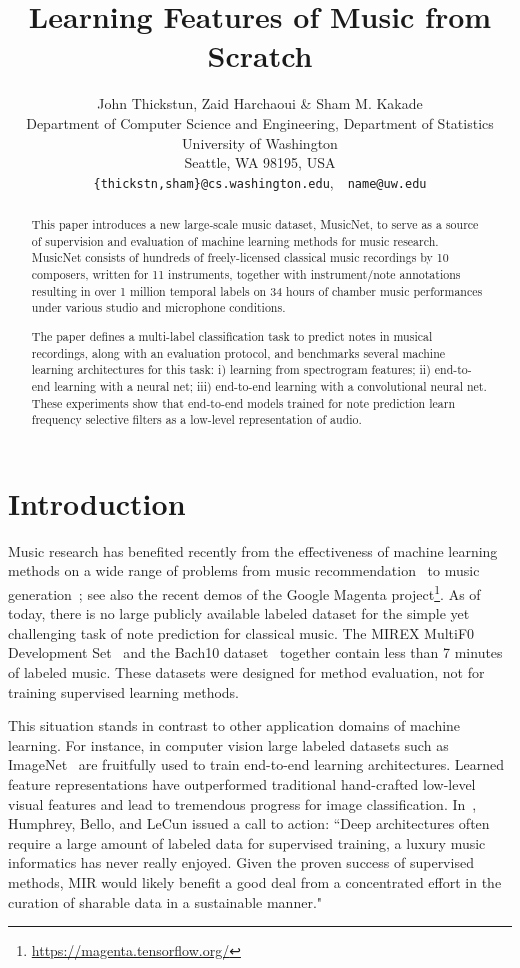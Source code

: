 \documentclass{article} \usepackage{iclr2017_conference,times}
\title{Learning Features of Music from Scratch}
\author{John Thickstun, Zaid Harchaoui \& Sham M. Kakade \\
 Department of Computer Science and Engineering,  Department of Statistics  \\
University of Washington\\
Seattle, WA 98195, USA \\
\texttt{\{thickstn,sham\}@cs.washington.edu},~~\texttt{name@uw.edu} \\
}
\begin{document}
\maketitle

\begin{abstract}
This paper introduces a new large-scale music dataset, MusicNet, to serve as a source 
of supervision and evaluation of machine learning methods for music research. 
MusicNet consists of hundreds of freely-licensed classical music recordings 
by 10 composers, written for 11 instruments, together with instrument/note 
annotations resulting in over 1 million temporal labels on 34 hours of chamber music
performances under various studio and microphone conditions. 

The paper defines a multi-label classification task to predict notes in musical recordings, 
along with an evaluation protocol, and benchmarks several machine learning architectures for this task: 
i) learning from spectrogram features; 
ii) end-to-end learning with a neural net; 
iii) end-to-end learning with a convolutional neural net. 
These experiments show that end-to-end models trained for note prediction learn frequency
selective filters as a low-level representation of audio. 
\end{abstract}

\section{Introduction}

Music research has benefited recently from the effectiveness of machine learning methods on a wide range of problems from music recommendation~\citep{spotify,mcfee} to music generation~\citep{deepbach}; see also the recent demos of the Google Magenta project\footnote{\url{https://magenta.tensorflow.org/}}. 
As of today, there is no large publicly available labeled dataset for the simple yet challenging task of note prediction for classical music. The MIREX MultiF0 Development Set~\citep{mirex_dataset} and the Bach10 dataset~\citep{bach10_dataset} together contain less than 7 minutes of labeled music. These datasets were designed for method evaluation, not for training supervised learning methods. 

This situation stands in contrast to other application domains of machine learning. For instance, in computer vision large labeled datasets such as ImageNet~\citep{imagenet} are fruitfully used to train end-to-end learning architectures. Learned feature representations have outperformed traditional hand-crafted low-level visual features and lead to tremendous progress for image classification. In~\citep{lecun}, Humphrey, Bello, and LeCun issued a call to action: ``Deep architectures often require a large amount of labeled data for supervised training, a luxury music informatics has never really enjoyed. Given the proven success of supervised methods, MIR would likely benefit a good deal from a concentrated effort in the curation of sharable data in a sustainable manner."
\end{document}
